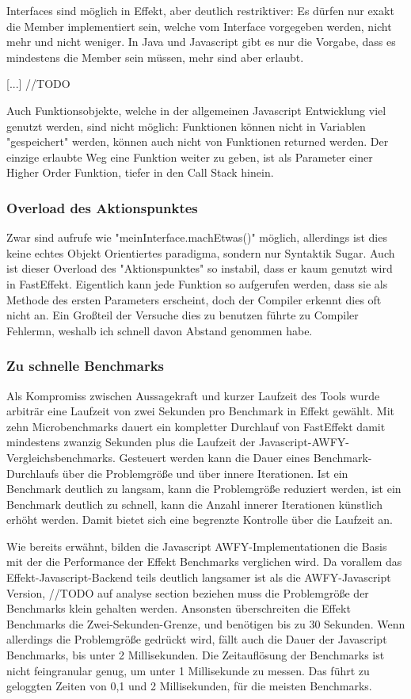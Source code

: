 Interfaces sind möglich in Effekt, aber deutlich restriktiver: Es dürfen nur exakt die Member implementiert sein, welche vom Interface vorgegeben werden, nicht mehr und nicht weniger.
In Java und Javascript gibt es nur die Vorgabe, dass es mindestens die Member sein müssen, mehr sind aber erlaubt.

[...] //TODO


Auch Funktionsobjekte, welche in der allgemeinen Javascript Entwicklung viel genutzt werden, sind nicht möglich: Funktionen können nicht in Variablen "gespeichert" werden, können auch nicht von Funktionen returned werden.
Der einzige erlaubte Weg eine Funktion weiter zu geben, ist als Parameter einer Higher Order Funktion, tiefer in den Call Stack hinein.




\subsubsection{ Overload des Aktionspunktes }
Zwar sind aufrufe wie "meinInterface.machEtwas()" möglich, allerdings ist dies keine echtes Objekt Orientiertes paradigma, sondern nur Syntaktik Sugar.
Auch ist dieser Overload des "Aktionspunktes" so instabil, dass er kaum genutzt wird in FastEffekt. Eigentlich kann jede Funktion so aufgerufen werden, dass sie als Methode des ersten Parameters erscheint, 
doch der Compiler erkennt dies oft nicht an. Ein Großteil der Versuche dies zu benutzen führte zu Compiler Fehlermn, weshalb ich schnell davon Abstand genommen habe.

\subsubsection{ Zu schnelle Benchmarks }
Als Kompromiss zwischen Aussagekraft und kurzer Laufzeit des Tools wurde arbiträr eine Laufzeit von zwei Sekunden pro Benchmark in Effekt gewählt.
Mit zehn Microbenchmarks dauert ein kompletter Durchlauf von FastEffekt damit mindestens zwanzig Sekunden plus die Laufzeit der Javascript-AWFY-Vergleichsbenchmarks.
Gesteuert werden kann die Dauer eines Benchmark-Durchlaufs über die Problemgröße und über innere Iterationen. Ist ein Benchmark deutlich zu langsam, kann die Problemgröße reduziert werden, ist ein Benchmark deutlich zu schnell, kann die Anzahl innerer Iterationen künstlich erhöht werden. Damit bietet sich eine begrenzte Kontrolle über die Laufzeit an.

Wie bereits erwähnt, bilden die Javascript AWFY-Implementationen die Basis mit der die Performance der Effekt Benchmarks verglichen wird.
Da vorallem das Effekt-Javascript-Backend teils deutlich langsamer ist als die AWFY-Javascript Version, //TODO auf analyse section beziehen
 muss die Problemgröße der Benchmarks klein gehalten werden. Ansonsten überschreiten die Effekt Benchmarks die Zwei-Sekunden-Grenze, und benötigen bis zu 30 Sekunden. Wenn allerdings die Problemgröße gedrückt wird, fällt auch die Dauer der Javascript Benchmarks, bis unter 2 Millisekunden. Die Zeitauflösung der Benchmarks ist nicht feingranular genug, um unter 1 Millisekunde zu messen. Das führt zu geloggten Zeiten von 0,1 und 2 Millisekunden, für die meisten Benchmarks. 

